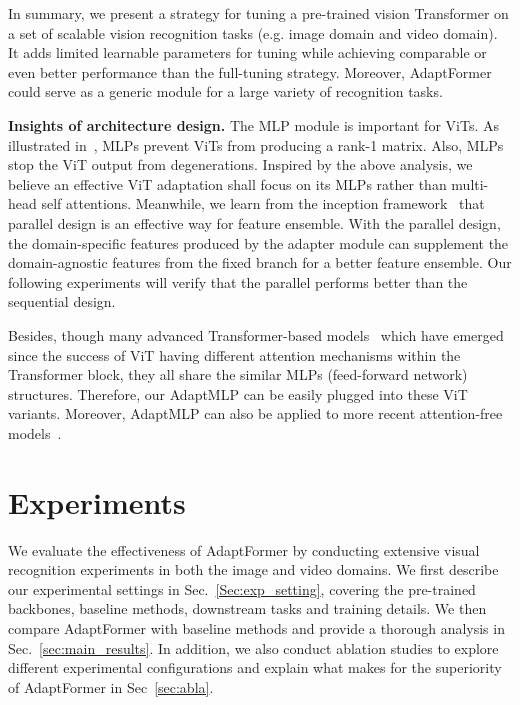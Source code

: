 In summary,  we present a strategy for tuning a pre-trained vision Transformer on a set of scalable vision recognition tasks (e.g. image domain and video domain). It adds limited learnable parameters for tuning while achieving comparable or even better performance than the full-tuning strategy. Moreover, AdaptFormer could serve as a generic module for a large variety of recognition tasks.

\textbf{Insights of architecture design.} The MLP module is important for ViTs. As illustrated in~\cite{dong2021attention}, MLPs prevent ViTs from producing a rank-1 matrix. Also, MLPs stop the ViT output from degenerations. Inspired by the above analysis, we believe an effective ViT adaptation shall focus on its MLPs rather than multi-head self attentions. Meanwhile, we learn from the inception framework~\cite{szegedy2015going} that parallel design is an effective way for feature ensemble. With the parallel design, the domain-specific features produced by the adapter module can supplement the domain-agnostic features from the fixed branch for a better feature ensemble. Our following experiments will verify that the parallel performs better than the sequential design.

Besides, though many advanced Transformer-based models~\cite{liu-iccv21-swin, wang2021pyramid, fan2021multiscale, yuan2021tokens} which have emerged since the success of ViT having different attention mechanisms within the Transformer block, they all share the similar MLPs (feed-forward network) structures. Therefore, our AdaptMLP can be easily plugged into these ViT variants. Moreover, AdaptMLP can also be applied to more recent attention-free models~\cite{tolstikhin2021mlp, liu2021pay, chen2022cyclemlp}.

\section{Experiments}

We evaluate the effectiveness of AdaptFormer by conducting extensive visual recognition experiments in both the image and video domains. We first describe our experimental settings in Sec.~\ref{Sec:exp_setting}, covering the pre-trained backbones, baseline methods, downstream tasks and training details. We then compare AdaptFormer with baseline methods and provide a thorough analysis in Sec.~\ref{sec:main_results}. In addition, we also conduct ablation studies to explore different experimental configurations and explain what makes for the superiority of AdaptFormer in Sec~\ref{sec:abla}.

